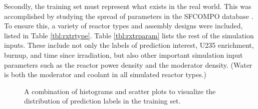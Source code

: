 Secondly, the training set must represent what exists in the real world. This
was accomplished by studying the spread of parameters in the \gls{SFCOMPO}
database \cite{sfcompo, valid_sfco}.  To ensure this, a variety of reactor
types and assembly designs were included, listed in Table \ref{tbl:rxtrtype}.
Table \ref{tbl:rxtrparam} lists the rest of the simulation inputs. These
include not only the labels of prediction interest, \gls{U235} enrichment,
burnup, and time since irradiation, but also other important simulation input
parameters such as the reactor power density and the moderator density.  (Water
is both the moderator and coolant in all simulated reactor types.)

\begin{figure}[!hbt]
  \caption{A combination of histograms and scatter plots to visualize the 
           distribution of prediction labels in the training set.}
  \label{fig:trainhist}
\end{figure}

